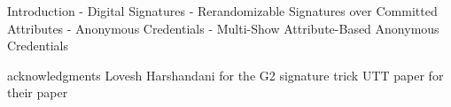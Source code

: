 Introduction
- Digital Signatures
- Rerandomizable Signatures over Committed Attributes
- Anonymous Credentials
- Multi-Show Attribute-Based Anonymous Credentials


acknowledgments 
Lovesh Harshandani for the G2 signature trick
UTT paper for their paper